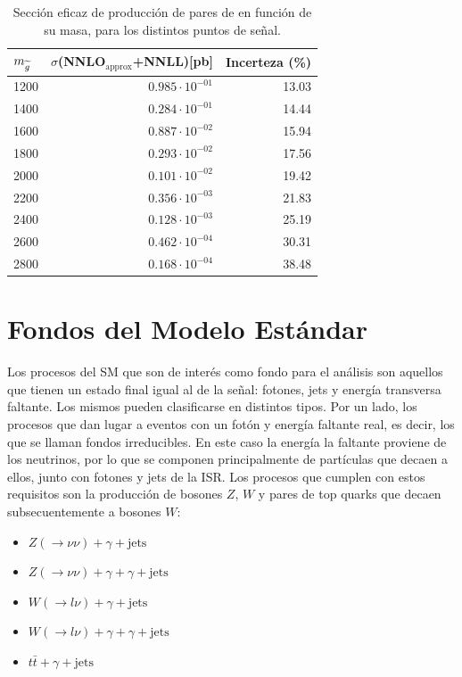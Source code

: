 \begin{table}[ht!]
  \centering
  \caption{Sección eficaz de producción de pares de \gluino en función de su masa, para los distintos puntos de señal.}
  \begin{tabular}{l r r}
  \hline
  \hline
    $m_{\widetilde{g}}$    & $\sigma$(NNLO$_\text{approx}$+NNLL)[pb] &    Incerteza (\%)  \\
    \hline
    \hline
    1200 & $0.985 \cdot 10^{-01}$ & 13.03 \\
    1400 & $0.284 \cdot 10^{-01}$ & 14.44 \\
    1600 & $0.887 \cdot 10^{-02}$ & 15.94 \\
    1800 & $0.293 \cdot 10^{-02}$ & 17.56 \\
    2000 & $0.101 \cdot 10^{-02}$ & 19.42 \\
    2200 & $0.356 \cdot 10^{-03}$ & 21.83 \\
    2400 & $0.128 \cdot 10^{-03}$ & 25.19 \\
    2600 & $0.462 \cdot 10^{-04}$ & 30.31 \\
    2800 & $0.168 \cdot 10^{-04}$ & 38.48 \\
    \hline
    \hline
  \end{tabular}
  \label{tab:gino_xs}
\end{table}





\section{Fondos del Modelo Estándar}\label{sec:sm_backgrounds}


Los procesos del SM que son de interés como fondo para el análisis son aquellos que tienen un estado final igual al de la señal: fotones, jets y energía transversa faltante. Los mismos pueden clasificarse en distintos tipos. Por un lado, los procesos que dan lugar a eventos con un fotón y energía faltante real, es decir, los que se llaman fondos irreducibles. En este caso la energía la faltante proviene de los neutrinos, por lo que se componen principalmente de partículas que decaen a ellos, junto con fotones y jets de la ISR. Los procesos que cumplen con estos requisitos son la producción de bosones $Z$, $W$ y pares de top quarks que decaen subsecuentemente a bosones $W$:

\begin{itemize}
  \item $Z(\rightarrow \nu\nu) + \gamma + \text{jets}$
  \item $Z(\rightarrow \nu\nu) + \gamma + \gamma + \text{jets}$
  \item $W(\rightarrow l\nu) + \gamma + \text{jets}$
  \item $W(\rightarrow l\nu) + \gamma + \gamma + \text{jets}$
  \item $t\bar{t} + \gamma + \text{jets}$
\end{itemize}

